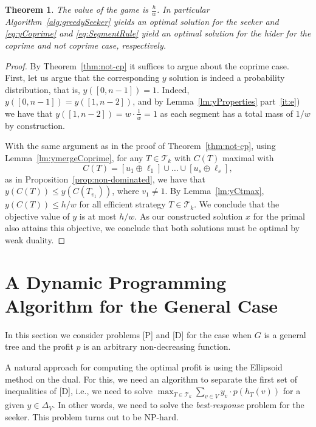 \documentclass[11pt]{article}
\newtheorem{theorem}{Theorem}[section]
\newcommand\+{\mkern2mu}
\newcommand{\T}{T}
\begin{document}
\begin{theorem} 
The value of the game is $\frac{h}{w}$. In particular Algorithm~\ref{alg:greedySeeker} yields an optimal solution for the seeker and \eqref{eq:yCoprime} and \eqref{eq:SegmentRule} yield an optimal solution for the hider for the coprime and not coprime case, respectively.
\end{theorem}
\begin{proof}
By Theorem~\ref{thm:not-cp} it suffices to argue about the coprime case. First, let us argue that the corresponding $y$ solution is indeed a probability distribution, that is, $y([0,n-1])=1$. Indeed, $y([0,n-1]) = y([1,n-2])$, and by Lemma~\ref{lm:yProperties} part~\ref{it:e}) we have that $y([1,n-2])=w \cdot \frac{1}{w}=1$ as each segment has a total mass of $1/w$ by construction.

With the same argument as in the proof of Theorem~\ref{thm:not-cp}, using Lemma~\ref{lm:ymergeCoprime}, for any $T\in \mathcal{T}_k$ with $C(T)$ maximal with 
$$C(T)=[u_1 \oplus \ell_1] \cup \ldots \cup [u_s \oplus \ell_s],$$
as in Proposition~\ref{prop:non-dominated}, we have that $y(C(T))\le y(C(T_{v_1}))$, where $v_1\neq 1$. By Lemma~\ref{lm:yCtmax}, $y(C(T))\le h/w$ for all efficient strategy $T\in \mathcal{T}_k$. We conclude that the objective value of $y$ is at most $h/w$. As our constructed solution $x$ for the primal also attains this objective, we conclude that both solutions must be optimal by weak duality.
\end{proof}


\section{A Dynamic Programming Algorithm for the General Case }\label{sec:DP}

In this section we consider problems [P] and [D] for the case when $G$ is a general tree and the profit $p$ is an arbitrary non-decreasing function.

A natural approach for computing the optimal profit is using the Ellipsoid method on the dual. For this, we need an algorithm to separate the first set of inequalities of [D], i.e., we need to solve $\max_{\T \in \mathcal{T}_k} \sum_{v \in V}y_{v} \cdot p(h_T(v))$ for a given $y\in \Delta_V$. In other words, we need to solve the \emph{best-response} problem for the seeker. 
This problem turns out to be NP-hard. 
\end{document}
